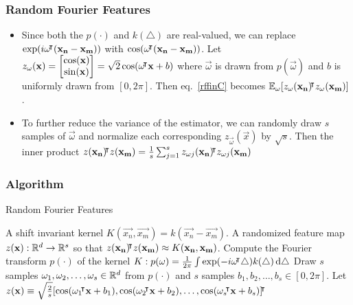 \documentclass[10pt]{../formats/RU}
\begin{document}
\begin{frame}
  \frametitle{Random Fourier Features}
  \begin{itemize}
    \item Since both the $p(\cdot)$ and $k(\triangle)$ are real-valued, we can replace $\exp(i\mathbf{\omega}{}^{\mkern-4mu\intercal}(\mathbf{x_n-x_m}))$ with $\cos(\mathbf{\omega}{}^{\mkern-4mu\intercal}(\mathbf{x_n-x_m}))$. Let
    $
    z_{\mathbf{\omega}}(\mathbf{x})=
    \begin{bmatrix}
      \cos(\mathbf{x}) \\
      \sin(\mathbf{x})
    \end{bmatrix}
    =\sqrt{2}\cos(\mathbf{\omega}{}^{\mkern-4mu\intercal}\mathbf{x}+b)$ where $\vec{\omega}$ is drawn from $p(\vec{\omega})$ and $b$ is uniformly drawn from $[0, 2\pi]$. Then eq.~\eqref{rffinC} becomes $\mathbb{E}_{\mathbf{\omega}}[z_{\mathbf{\omega}}(\mathbf{x_n}){}^{\mkern-4mu\intercal} z_{\mathbf{\omega}}(\mathbf{x_m})]$.
    \item To further reduce the variance of the estimator, we can randomly draw $s$ samples of $\vec{\omega}$ and normalize each corresponding $z_{\vec{\omega}}(\vec{x})$ by $\sqrt{s}$. Then the inner product $z(\mathbf{x_n}){}^{\mkern-4mu\intercal} z(\mathbf{x_m})=\frac{1}{s}\sum_{j=1}^{s}z_{\mathbf{\omega}j}(\mathbf{x_n}){}^{\mkern-4mu\intercal} z_{\mathbf{\omega}j}(\mathbf{x_m})$
  \end{itemize}
\end{frame}
\begin{frame}
  \frametitle{Algorithm}
  \begin{algorithm}[H]
    \caption{Random Fourier Features}\label{RFF}
    \begin{algorithmic}
    \Require A shift invariant kernel $K(\vec{x_n}, \vec{x_m}) = k(\vec{x_n}- \vec{x_m})$.
    \Ensure A randomized feature map $z(\mathbf{x}): \mathbb{R}^d\rightarrow\mathbb{R}^s$ so that $z(\mathbf{x_n}){}^{\mkern-4mu\intercal} z(\mathbf{x_m})\approx K(\mathbf{x_n}, \mathbf{x_m})$.
    \State Compute the Fourier transform $p(\cdot)$ of the kernel $K: p(\mathbf{\omega})=\frac{1}{2\pi}\int \exp(-i\mathbf{\omega}{}^{\mkern-4mu\intercal}\triangle)k(\triangle)\mathop{}\!\mathrm{d}\triangle$
    \State Draw $s$ \iid samples $\mathbf{\omega}_1, \mathbf{\omega}_2, \ldots, \mathbf{\omega}_s \in \mathbb{R}^d$ from $p(\cdot)$ and $s$ \iid samples $b_1, b_2, \ldots, b_s \in [0, 2\pi]$.
    \State Let $z(\mathbf{x})\equiv \sqrt{\frac{2}{s}}[\cos(\mathbf{\omega}_1{}^{\mkern-4mu\intercal}\mathbf{x}+b_1), \cos(\mathbf{\omega}_2{}^{\mkern-4mu\intercal}\mathbf{x}+b_2), \ldots, \cos(\mathbf{\omega}_s{}^{\mkern-4mu\intercal}\mathbf{x}+b_s)]{}^{\mkern-4mu\intercal}$
    \end{algorithmic}
  \end{algorithm}
\end{frame}
\end{document}
